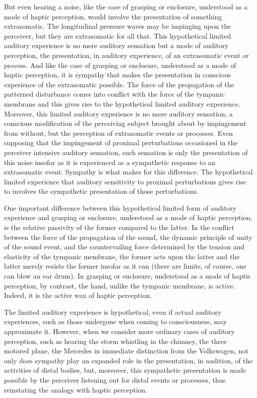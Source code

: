 But even hearing a noise, like the case of grasping or enclosure, understood as a mode of haptic perception, would involve the presentation of something extrasomatic. The longitudinal pressure waves may be impinging upon the perceiver, but they are extrasomatic for all that. This hypothetical limited auditory experience is no mere auditory sensation but a mode of auditory perception, the presentation, in auditory experience, of an extrasomatic event or process. And like the case of grasping or enclosure, understood as a mode of haptic perception, it is sympathy that makes the presentation in conscious experience of the extrasomatic possible. The force of the propagation of the patterned disturbance comes into conflict with the force of the tympanic membrane and this gives rise to the hypothetical limited auditory experience. Moreover, this limited auditory experience is no mere auditory sensation, a conscious modification of the perceiving subject brought about by impingement from without, but the perception of extrasomatic events or processes. Even supposing that the impingement of proximal perturbations occasioned in the perceiver intensive auditory sensation, such sensation is only the presentation of this noise insofar as it is experienced as a sympathetic response to an extrasomatic event. Sympathy is what makes for this difference. The hypothetical limited experience that auditory sensitivity to proximal perturbations gives rise to involves the sympathetic presentation of those perturbations. 

One important difference between this hypothetical limited form of auditory experience and grasping or enclosure, understood as a mode of haptic perception, is the relative passivity of the former compared to the latter. In the conflict between the force of the propagation of the sound, the dynamic principle of unity of the sound event, and the countervailing force determined by the tension and elasticity of the tympanic membrane, the former acts upon the latter and the latter merely resists the former insofar as it can (there are limits, of course, one can blow an ear drum). In grasping or enclosure, understood as a mode of haptic perception, by contrast, the hand, unlike the tympanic membrane, is active. Indeed, it is the active wax of haptic perception.

The limited auditory experience is hypothetical, even if actual auditory experiences, such as those undergone when coming to consciousness, may approximate it. However, when we consider more ordinary cases of auditory perception, such as hearing the storm whistling in the chimney, the three motored plane, the Mercedes in immediate distinction from the Volkswagen, not only does sympathy play an expanded role in the presentation, in audition, of the activities of distal bodies, but, moreover, this sympathetic presentation is made possible by the perceiver listening out for distal events or processes, thus reinstating the analogy with haptic perception.

